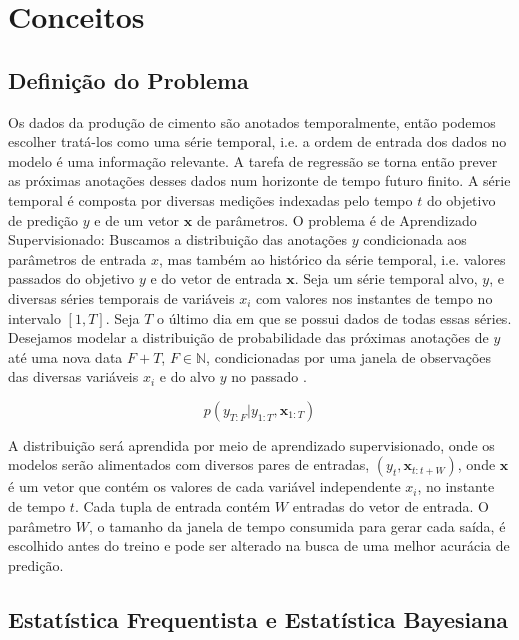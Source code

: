 \chapter{Conceitos}
\label{cap:conceitos}


\section{Definição do Problema}


Os dados da produção de cimento são anotados temporalmente, então podemos escolher
tratá-los como uma série temporal, i.e. a ordem de entrada dos dados no modelo
é uma informação relevante. A tarefa de regressão se torna então prever as próximas anotações desses
dados num horizonte de tempo futuro finito. A série temporal é composta por diversas medições indexadas pelo tempo $t$ do objetivo
de predição $y$ e de um vetor $\textbf{x}$ de parâmetros. O problema é de Aprendizado
Supervisionado: Buscamos a distribuição das anotações $y$ condicionada
aos parâmetros de entrada $x$, mas também ao
histórico da série temporal, i.e. valores passados do objetivo $y$ e do
vetor de entrada $\textbf{x}$. 
Seja um série temporal alvo, $y$, e diversas séries temporais de variáveis
 $x_i$ com valores nos instantes de tempo no intervalo $[1,T]$. Seja $T$ o último dia em que se possui dados de todas essas
séries. Desejamos modelar a distribuição de probabilidade das próximas anotações
de $y$ até uma nova data $F + T$, $F \in \mathbb{N}$, condicionadas por uma janela de
observações das diversas variáveis  $x_i$ e do alvo $y$ no passado \citep{deepfactors}.

\[ p(y_{T:F} | y_{1:T},\textbf{x}_{{1}:T}) \]

A distribuição será aprendida por meio de aprendizado supervisionado, onde os
modelos serão alimentados com diversos pares de entradas,
$(y_t,\textbf{x}_{t:t+W})$, onde $\textbf{x}$ é um vetor que contém os valores de
cada variável independente $x_i$, no instante de tempo $t$. Cada tupla de
entrada contém $W$ entradas do vetor de entrada. O parâmetro $W$, o
tamanho da janela de tempo consumida para gerar cada saída, é escolhido antes do
treino e pode ser alterado na busca de uma melhor acurácia de predição.

\section{Estatística Frequentista e Estatística Bayesiana}
 

